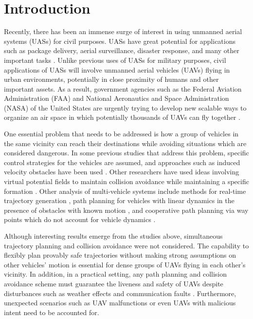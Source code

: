 \section{Introduction}
Recently, there has been an immense surge of interest in using unmanned aerial systems (UASs) for civil purposes. UASs have great potential for applications such as package delivery, aerial surveillance, disaster response, and many other important tasks \cite{Tice91, Debusk10, Amazon16, AUVSI16, BBC16}. Unlike previous uses of UASs for military purposes, civil applications of UASs will involve unmanned aerial vehicles (UAVs) flying in urban environments, potentially in close proximity of humans and other important assets. As a result, government agencies such as the Federal Aviation Administration (FAA) and National Aeronautics and Space Administration (NASA) of the United States are urgently trying to develop new scalable ways to organize an air space in which potentially thousands of UAVs can fly together \cite{FAA13, NASA16, Kopardekar16}.

One essential problem that needs to be addressed is how a group of vehicles in the same vicinity can reach their destinations while avoiding situations which are considered dangerous. In some previous studies that address this problem, specific control strategies for the vehicles are assumed, and approaches such as induced velocity obstacles have been used \cite{Fiorini98, Chasparis05, Vandenberg08}. Other researchers have used ideas involving virtual potential fields to maintain collision avoidance while maintaining a specific formation \cite{Olfati-Saber2002, Chuang07}. Other analysis of multi-vehicle systems include methods for real-time trajectory generation \cite{Feng-LiLian2002}, path planning for vehicles with linear dynamics in the presence of obstacles with known motion \cite{Ahmadzadeh2009}, and cooperative path planning via way points which do not account for vehicle dynamics \cite{Bellingham}.

Although interesting results emerge from the studies above, simultaneous trajectory planning and collision avoidance were not considered. The capability to flexibly plan provably safe trajectories without making strong assumptions on other vehicles' motion is essential for dense groups of UAVs flying in each other's vicinity. In addition, in a practical setting, any path planning and collision avoidance scheme must guarantee the liveness and safety of UAVs despite disturbances such as weather effects and communication faults \cite{Kopardekar16}. Furthermore, unexpected scenarios such as UAV malfunctions or even UAVs with malicious intent need to be accounted for.

